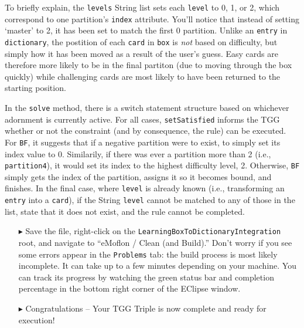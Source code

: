To briefly explain, the \texttt{levels} String list sets each \texttt{level} to 0, 1, or 2, which correspond to one partition's \texttt{index} attribute. You'll
notice that instead of setting `master' to 2, it has been set to match the first 0 partition. Unlike an \texttt{entry} in \texttt{dictionary}, the postition of
each \texttt{card} in \texttt{box} is \emph{not} based on difficulty, but simply how it has been moved as a result of the user's guess. Easy cards are therefore
more likely to be in the final partiton (due to moving through the box quickly) while challenging cards are most likely to have been returned to the starting
position.

In the \texttt{solve} method, there is a switch statement structure based on whichever adornment is currently active. For all cases, \texttt{setSatisfied}
informs the TGG whether or not the constraint (and by consequence, the rule) can be executed. For \texttt{BF}, it suggests that if a negative partition were to
exist, to simply set its index value to 0. Similarily, if there was ever a partition more than 2 (i.e., \texttt{partition4}), it would set its index to the
highest difficulty level, 2. Otherwise, \texttt{BF} simply gets the index of the partition, assigns it so it becomes bound, and finishes. In the final case,
where \texttt{level} is already known (i.e., transforming an \texttt{entry} into a \texttt{card}), if the String \texttt{level} cannot be matched to any of
those in the list, state that it does not exist, and the rule cannot be completed.

\begin{itemize}

\item[$\blacktriangleright$] Save the file, right-click on the \texttt{Learning\-Box\-To\-Dictionary\-Integration} root, and navigate to ``eMoflon / Clean (and
Build).'' Don't worry if you see some errors appear in the \texttt{Problems} tab: the build process is most likely incomplete. It can take up to a few minutes
depending on your machine. You can track its progress by watching the green status bar and completion percentage in the bottom right corner of the EClipse
window.

\item[$\blacktriangleright$] Congratulations -- Your TGG Triple is now complete and ready for execution!

\end{itemize}
